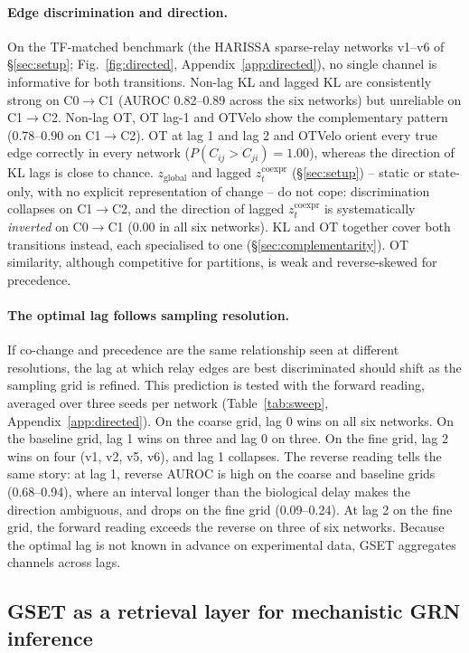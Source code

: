 \documentclass[10pt, letterpaper]{article}
\newcommand{\zco}{z^{\mathrm{coexpr}}}
\begin{document}
\paragraph{Edge discrimination and direction.} On the TF-matched benchmark (the HARISSA sparse-relay networks v1--v6 of \S\ref{sec:setup}; Fig.~\ref{fig:directed}, Appendix~\ref{app:directed}), no single channel is informative for both transitions. Non-lag KL and lagged KL are consistently strong on C0$\to$C1 (AUROC 0.82--0.89 across the six networks) but unreliable on C1$\to$C2. Non-lag OT, OT lag-1 and OTVelo show the complementary pattern (0.78--0.90 on C1$\to$C2). OT at lag 1 and lag 2 and OTVelo orient every true edge correctly in every network ($P(C_{ij}>C_{ji})=1.00$), whereas the direction of KL lags is close to chance. $z_{\mathrm{global}}$ and lagged $\zco_t$ (\S\ref{sec:setup}) -- static or state-only, with no explicit representation of change -- do not cope: discrimination collapses on C1$\to$C2, and the direction of lagged $\zco_t$ is systematically \emph{inverted} on C0$\to$C1 (0.00 in all six networks). KL and OT together cover both transitions instead, each specialised to one (\S\ref{sec:complementarity}). OT similarity, although competitive for partitions, is weak and reverse-skewed for precedence.



\paragraph{The optimal lag follows sampling resolution.} If co-change and precedence are the same relationship seen at different resolutions, the lag at which relay edges are best discriminated should shift as the sampling grid is refined. This prediction is tested with the forward reading, averaged over three seeds per network (Table~\ref{tab:sweep}, Appendix~\ref{app:directed}). On the coarse grid, lag 0 wins on all six networks. On the baseline grid, lag 1 wins on three and lag 0 on three. On the fine grid, lag 2 wins on four (v1, v2, v5, v6), and lag 1 collapses. The reverse reading tells the same story: at lag 1, reverse AUROC is high on the coarse and baseline grids (0.68--0.94), where an interval longer than the biological delay makes the direction ambiguous, and drops on the fine grid (0.09--0.24). At lag 2 on the fine grid, the forward reading exceeds the reverse on three of six networks. Because the optimal lag is not known in advance on experimental data, GSET aggregates channels across lags.


\subsection{GSET as a retrieval layer for mechanistic GRN inference}
\label{sec:mechanistic}
\end{document}
